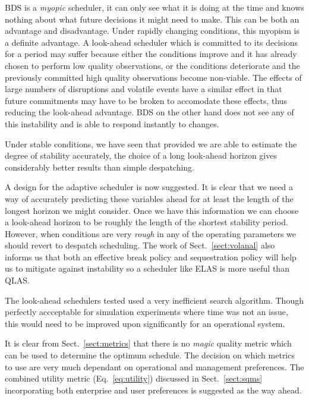  BDS is a \emph{myopic} scheduler, it can only see what it is doing at the time and knows nothing about what future decisions it might need to make. This can be both an advantage and disadvantage. Under rapidly changing conditions, this myopism is a definite advantage. A look-ahead scheduler which is committed to its decisions for a period may suffer because either the conditions improve and it has already chosen to perform low quality observations, or the conditions deteriorate and the previously committed high quality observations become non-viable. The effects of large numbers of disruptions and volatile events have a similar effect in that future commitments may have to be broken to accomodate these effects, thus reducing the look-ahead advantage. BDS on the other hand does not see any of this instability and is able to respond instantly to changes.

Under stable conditions, we have seen that provided we are able to estimate the degree of stability accurately, the choice of a long look-ahead horizon gives considerably better results than simple despatching.

A design for the adaptive scheduler is now suggested. It is clear that we need a way of accurately predicting these variables ahead for at least the length of the longest horizon we might consider. Once we have this information we can choose a look-ahead horizon to be roughly the length of the shortest stability period. However, when conditions are very \emph{rough} in any of the operating parameters we should revert to despatch scheduling. The work of Sect.~\ref{sect:volanal} also informs us that both an effective break policy and sequestration policy will help us to mitigate against instability so a scheduler like ELAS is more useful than QLAS.

The look-ahead schedulers tested used a very inefficient search algorithm. Though perfectly accceptable for simulation experiments where time was not an issue, this would need to be improved upon significantly for an operational system.

It is clear from Sect.~\ref{sect:metrics} that there is no \emph{magic} quality metric which can be used to determine the optimum schedule. The decision on which metrics to use are very much dependant on operational and management preferences. The combined utility metric (Eq.~\ref{eq:utility}) discussed in Sect.~\ref{sect:sqms} incorporating both enterprise and user preferences is suggested as the way ahead.

